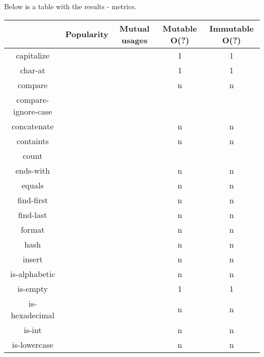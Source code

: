 \documentclass[anonymous,sigplan,review,11pt,nonacm,natbib=false]{acmart}
\begin{document}
Below is a table with the results - metrics.

\begin{table*}[]
    \centering
    \begin{tabular}{|c||c|c|c|c|}
        \hline
         & Popularity & Mutual usages & Mutable O(?) & Immutable O(?) \\ \hline \hline
        capitalize &  &  & 1 & 1 \\ \hline

        char-at &  &  & 1 & 1 \\ \hline

        compare &  &  & n & n \\ \hline

        compare-ignore-case &  &  &  & \\ \hline

        concatenate &  &  & n & n \\ \hline

        containts &  &  & n & n \\ \hline

        count &  &  &  & \\ \hline

        ends-with &  &  & n & n \\ \hline

        equals &  &  & n & n \\ \hline

        find-first &  &  & n & n \\ \hline

        find-last &  &  & n & n \\ \hline

        format &  &  & n & n \\ \hline

        hash &  &  & n & n \\ \hline

        insert &  &  & n & n \\ \hline

        is-alphabetic &  &  & n & n \\ \hline

        is-empty &  &  & 1 & 1 \\ \hline

        is-hexadecimal &  &  & n & n \\ \hline

        is-int &  &  & n & n \\ \hline

        is-lowercase &  &  & n & n \\ \hline


\end{tabular}
\end{table*}
\end{document}
